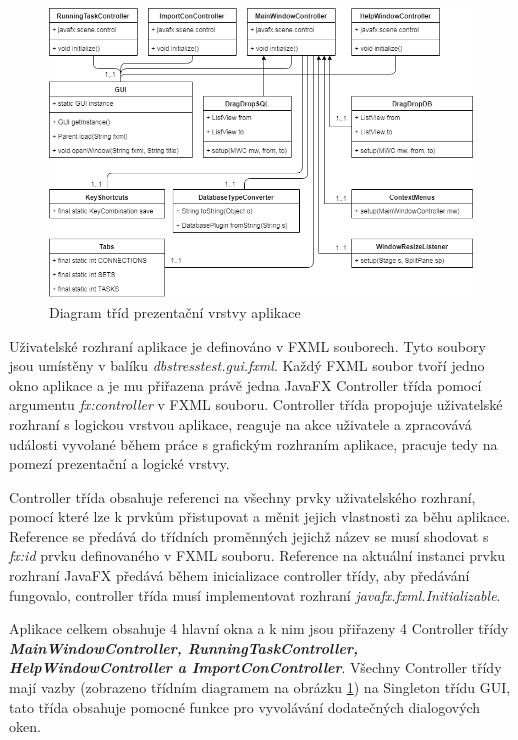\documentclass[czech,bachelor,public,dept460,male,cpdeclaration,twoside]{diploma}
\begin{document}
\begin{figure}[!htbp]\centering\includegraphics[width=1.0\textwidth]{Figures/presentlayer.png}\caption{Diagram tříd prezentační vrstvy aplikace}\label{presentdiagram}
\end{figure}

Uživatelské rozhraní aplikace je definováno v FXML souborech. Tyto soubory jsou umístěny v balíku \textit{dbstresstest.gui.fxml}. Každý FXML soubor tvoří jedno okno aplikace a je mu přiřazena právě jedna JavaFX Controller třída pomocí argumentu \textit{fx:controller} v FXML souboru. Controller třída propojuje uživatelské rozhraní s logickou vrstvou aplikace, reaguje na akce uživatele a zpracovává události vyvolané během práce s grafickým rozhraním aplikace, pracuje tedy na pomezí prezentační a logické vrstvy.

Controller třída obsahuje referenci na všechny prvky uživatelského rozhraní, pomocí které lze k prvkům přistupovat a měnit jejich vlastnosti za běhu aplikace. Reference se předává do třídních proměnných jejichž název se musí shodovat s \textit{fx:id} prvku definovaného v FXML souboru. Reference na aktuální instanci prvku rozhraní JavaFX předává během inicializace controller třídy, aby předávání fungovalo, controller třída musí implementovat rozhraní \textit{javafx.fxml.Initializable}.

Aplikace celkem obsahuje 4 hlavní okna a k nim jsou přiřazeny 4 Controller třídy \newline \textbf{\emph{MainWindowController, RunningTaskController, HelpWindowController a ImportConController}}. Všechny Controller třídy mají vazby (zobrazeno třídním diagramem na obrázku \ref{presentdiagram}) na Singleton třídu GUI, tato třída obsahuje pomocné funkce pro vyvolávání dodatečných dialogových oken. 
\end{document}

